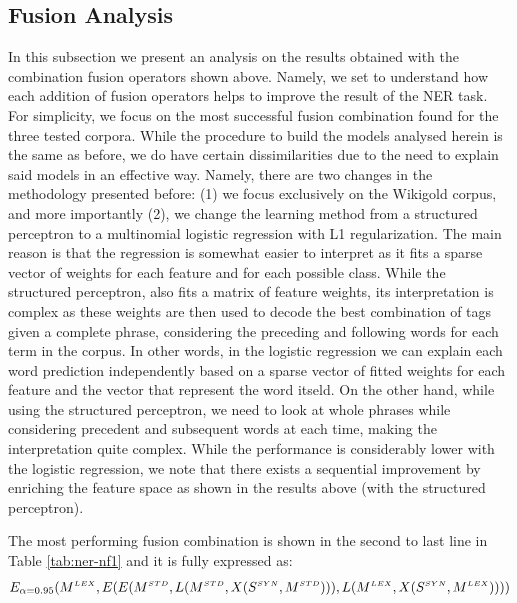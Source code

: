 \subsection{Fusion Analysis}
In this subsection we present an analysis on the results obtained with the combination fusion operators shown  above. Namely, we set to understand how each addition of fusion operators helps to improve the result of the NER task. For simplicity,  we focus on the most successful fusion combination found for the three tested corpora. While the procedure to build the models analysed herein is the same as before, we do have certain dissimilarities due to the need to explain said models in an effective way. Namely, there are two changes in the methodology presented before: (1) we focus exclusively on the Wikigold corpus, and more importantly (2), we change the learning method from a structured perceptron to a multinomial logistic regression with L1 regularization. The main reason is that the regression is somewhat easier to interpret as it fits a sparse vector of weights for each feature and for each possible class. While the structured perceptron, also fits a matrix of feature weights, its interpretation is complex as these weights are then used to decode the best combination of tags given a complete phrase, considering the preceding and following words for each term in the corpus. In other words, in the logistic regression we can explain each word prediction independently based on a sparse vector of fitted weights for each feature and the vector that represent the word itseld. On the other hand, while using the structured perceptron, we need to look at whole phrases  while considering precedent and subsequent words at each time, making the interpretation quite complex. While the performance is considerably lower with the logistic regression, we note that there exists a sequential improvement  by enriching the feature space as shown in the results above (with the structured perceptron).

The most performing fusion combination is shown in the second to last line in Table \ref{tab:ner-nf1} and it is fully expressed as:    
\begin{equation}\label{eq:big_fusion}
E_{\alpha=0.95}(M^{\scriptscriptstyle LEX},  E(E(M^{\scriptscriptstyle STD}, 	 L(M^{\scriptscriptstyle STD}, X(S^{\scriptscriptstyle SYN}, M^{\scriptscriptstyle STD}))), L(M^{\scriptscriptstyle LEX}, X(S^{\scriptscriptstyle SYN}, M^{\scriptscriptstyle LEX}))))
\end{equation}

